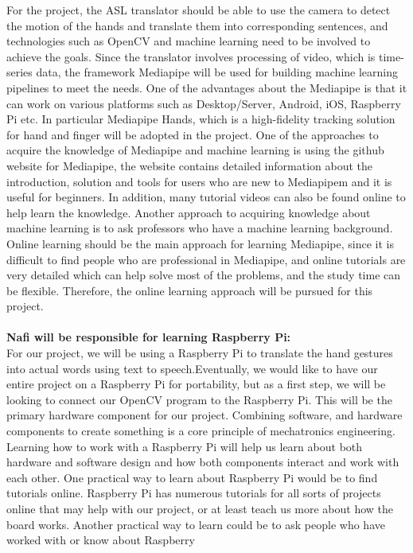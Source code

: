 \documentclass[12pt]{article}
\begin{document}
For the project, the ASL translator should be able to use the camera to detect the motion of the hands and translate 
them into corresponding sentences, and technologies such as OpenCV and machine learning need to be involved to achieve 
the goals.  Since the translator involves processing of video, which is time-series data, the framework Mediapipe will be 
used for building machine learning pipelines to meet the needs. One of the advantages about the Mediapipe is that it can work on various platforms such as Desktop/Server, 
Android, iOS, Raspberry Pi etc. In particular Mediapipe Hands, which is a high-fidelity tracking solution for hand and finger will be adopted in the project. One of the 
approaches to acquire the knowledge of Mediapipe and machine learning is using the github website for Mediapipe, the website contains detailed information about the 
introduction, solution and tools for users who are new to Mediapipem and it is useful for beginners. In addition, many tutorial videos can also be found online to help 
learn the knowledge. Another approach to acquiring knowledge about machine learning is to ask professors who have a machine learning background. Online learning should 
be the main approach for learning Mediapipe, since it is difficult to find people who are professional in Mediapipe, and online tutorials are very detailed which can help 
solve most of the problems, and the study time can be flexible. Therefore, the online learning approach will be pursued for this project.\\
~\\
\textbf{Nafi will be responsible for learning Raspberry Pi:}\\
For our project, we will be using a Raspberry Pi to translate the hand gestures into actual words using text to speech.Eventually, we
would like to have our entire project on a Raspberry Pi for portability, but as a first step, we will be looking to connect our OpenCV
program to the Raspberry Pi. This will be the primary hardware component for our project. Combining software, and hardware components to
create something is a core principle of mechatronics engineering. Learning how to work with a Raspberry Pi will help us learn about both
hardware and software design and how both components interact and work with each other. One practical way to learn about Raspberry Pi would
be to find tutorials online. Raspberry Pi has numerous tutorials for all sorts of projects online that may help with our project, or at least
teach us more about how the board works. Another practical way to learn could be to ask people who have worked with or know about Raspberry
\end{document}
